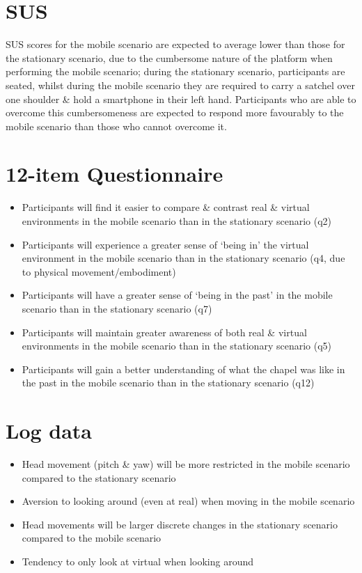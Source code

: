 
\section{SUS}
SUS scores for the mobile scenario are expected to average lower than those for the stationary scenario, due to the cumbersome nature of the platform when performing the mobile scenario; during the stationary scenario, participants are seated, whilst during the mobile scenario they are required to carry a satchel over one shoulder \& hold a smartphone in their left hand. Participants who are able to overcome this cumbersomeness are expected to respond more favourably to the mobile scenario than those who cannot overcome it.

\section{12-item Questionnaire}
\begin{itemize}
	\item Participants will find it easier to compare \& contrast real \& virtual environments in the mobile scenario than in the stationary scenario (q2)
	\item Participants will experience a greater  sense of `being in' the virtual environment in the mobile scenario than in the stationary scenario (q4, due to physical movement/embodiment)
	\item Participants will have a greater sense of `being in the past' in the mobile scenario than in the stationary scenario (q7)
	\item Participants will maintain greater awareness of both real \& virtual environments in the mobile scenario than in the stationary scenario (q5)
	\item Participants will gain a better understanding of what the chapel was like in the past in the mobile scenario than in the stationary scenario (q12)
\end{itemize}

\section{Log data}
\begin{itemize}
	\item Head movement (pitch \& yaw) will be more restricted in the mobile scenario compared to the stationary scenario
	\item Aversion to looking around (even at real) when moving in the mobile scenario
	\item Head movements will be larger discrete changes in the stationary scenario compared to the mobile scenario
	\item Tendency to only look at virtual when looking around
\end{itemize}


